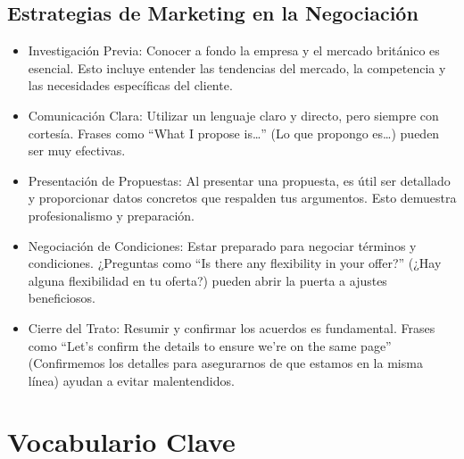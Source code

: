\documentclass[letterpaper, 12pt]{article}
\begin{document}
\subsection*{Estrategias de Marketing en la Negociación}

\begin{itemize}
      \item Investigación Previa: Conocer a fondo la empresa y el mercado británico es
            esencial. Esto incluye entender las tendencias del mercado, la competencia y
            las necesidades específicas del cliente.
      \item Comunicación Clara: Utilizar un lenguaje claro y directo, pero siempre con
            cortesía. Frases como “What I propose is…” (Lo que propongo es…) pueden ser muy
            efectivas.
      \item Presentación de Propuestas: Al presentar una propuesta, es útil ser detallado y
            proporcionar datos concretos que respalden tus argumentos. Esto demuestra
            profesionalismo y preparación.
      \item Negociación de Condiciones: Estar preparado para negociar términos y
            condiciones. ¿Preguntas como “Is there any flexibility in your offer?” (¿Hay
            alguna flexibilidad en tu oferta?) pueden abrir la puerta a ajustes
            beneficiosos.
      \item Cierre del Trato: Resumir y confirmar los acuerdos es fundamental. Frases como
            “Let’s confirm the details to ensure we’re on the same page” (Confirmemos los
            detalles para asegurarnos de que estamos en la misma línea) ayudan a evitar
            malentendidos.
\end{itemize}

\section*{Vocabulario Clave}
\end{document}

